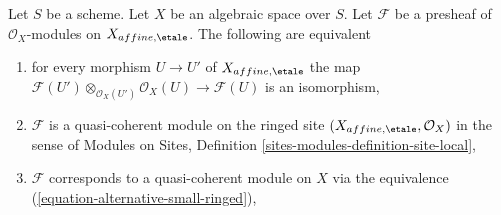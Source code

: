 \begin{lemma}
\label{lemma-quasi-coherent-alternative-small}
Let $S$ be a scheme. Let $X$ be an algebraic space over $S$.
Let $\mathcal{F}$ be a presheaf of $\mathcal{O}_X$-modules
on $X_{affine, \etale}$. The following are equivalent
\begin{enumerate}
\item for every morphism $U \to U'$ of $X_{affine, \etale}$ the map
$\mathcal{F}(U') \otimes_{\mathcal{O}_X(U')} \mathcal{O}_X(U)
\to \mathcal{F}(U)$ is an isomorphism,
\item $\mathcal{F}$ is a quasi-coherent module on the ringed site
$(X_{affine, \etale}, \mathcal{O}_X)$ in the sense of
Modules on Sites, Definition \ref{sites-modules-definition-site-local},
\item $\mathcal{F}$ corresponds to a quasi-coherent module on $X$
via the equivalence (\ref{equation-alternative-small-ringed}),
\end{enumerate}
\end{lemma}

